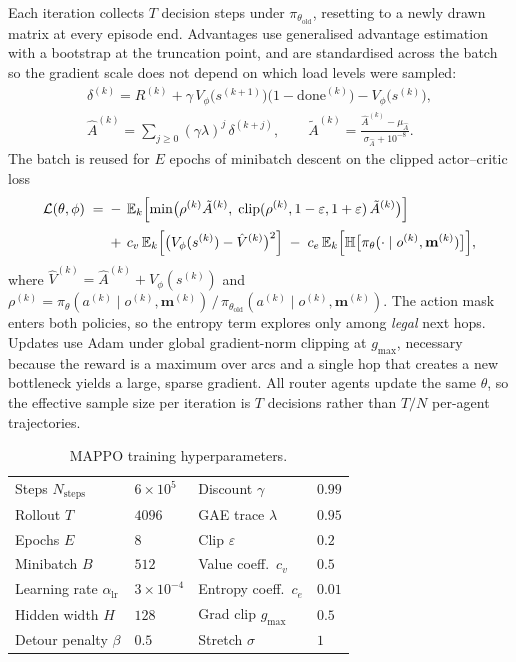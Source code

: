 Each iteration collects $T$ decision steps under $\pi_{\theta_{\mathrm{old}}}$, resetting to a
newly drawn matrix at every episode end. Advantages use generalised advantage estimation with a
bootstrap at the truncation point, and are standardised across the batch so the gradient scale
does not depend on which load levels were sampled:
\begin{equation}
\begin{gathered}
\delta^{(k)} = R^{(k)} + \gamma\,V_\phi\bigl(s^{(k+1)}\bigr)\bigl(1-\mathrm{done}^{(k)}\bigr) - V_\phi\bigl(s^{(k)}\bigr), \\[3pt]
\hat{A}^{(k)} = \sum_{j\ge 0} (\gamma\lambda)^{j}\,\delta^{(k+j)},
\qquad
\tilde{A}^{(k)} = \frac{\hat{A}^{(k)} - \mu_{\hat{A}}}{\sigma_{\hat{A}} + 10^{-8}} .
\end{gathered}
\end{equation}
The batch is reused for $E$ epochs of minibatch descent on the clipped actor--critic loss
\begin{equation}
\begin{aligned}
\mathcal{L}(\theta,\phi) \;=\;
&-\,\mathbb{E}_{k}\Bigl[\min\bigl(\rho^{(k)}\tilde{A}^{(k)},\;
\mathrm{clip}(\rho^{(k)},1-\varepsilon,1+\varepsilon)\,\tilde{A}^{(k)}\bigr)\Bigr] \\[2pt]
&+\, c_v\,\mathbb{E}_{k}\Bigl[\bigl(V_\phi(s^{(k)})-\hat{V}^{(k)}\bigr)^{2}\Bigr]
\;-\; c_e\,\mathbb{E}_{k}\Bigl[\mathbb{H}\bigl[\pi_\theta(\cdot\mid o^{(k)},\mathbf{m}^{(k)})\bigr]\Bigr],
\end{aligned}
\end{equation}
where $\hat{V}^{(k)} = \hat{A}^{(k)} + V_\phi(s^{(k)})$ and
$\rho^{(k)} = \pi_\theta(a^{(k)}\mid o^{(k)},\mathbf{m}^{(k)}) \,/\,
\pi_{\theta_{\mathrm{old}}}(a^{(k)}\mid o^{(k)},\mathbf{m}^{(k)})$. The action mask enters both
policies, so the entropy term explores only among \emph{legal} next hops. Updates use Adam under
global gradient-norm clipping at $g_{\max}$, necessary because the reward is a maximum over arcs
and a single hop that creates a new bottleneck yields a large, sparse gradient. All router agents
update the same $\theta$, so the effective sample size per iteration is $T$ decisions rather than
$T/N$ per-agent trajectories.

\begin{table}[h]
\centering
\begin{tabular}{llll}
\hline
Steps $N_{\mathrm{steps}}$ & $6\times10^{5}$ & Discount $\gamma$ & $0.99$ \\
Rollout $T$ & $4096$ & GAE trace $\lambda$ & $0.95$ \\
Epochs $E$ & $8$ & Clip $\varepsilon$ & $0.2$ \\
Minibatch $B$ & $512$ & Value coeff.\ $c_v$ & $0.5$ \\
Learning rate $\alpha_{\mathrm{lr}}$ & $3\times10^{-4}$ & Entropy coeff.\ $c_e$ & $0.01$ \\
Hidden width $H$ & $128$ & Grad clip $g_{\max}$ & $0.5$ \\
Detour penalty $\beta$ & $0.5$ & Stretch $\sigma$ & $1$ \\
\hline
\end{tabular}
\caption{MAPPO training hyperparameters.}
\label{tab:hyperparams}
\end{table}

